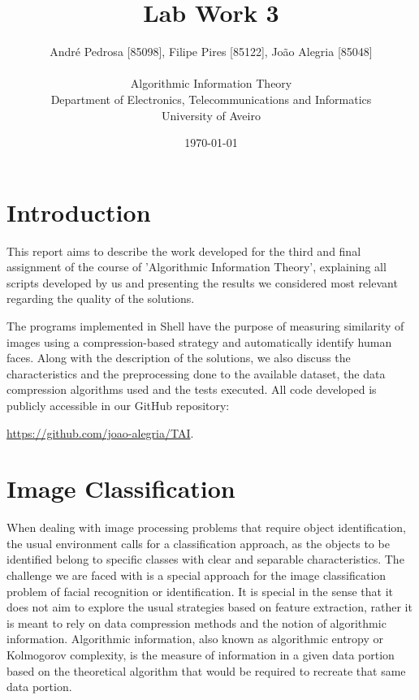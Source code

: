 \documentclass[12pt]{article}
\title{Lab Work 3}
\author
{André Pedrosa [85098], Filipe Pires [85122], João Alegria [85048]\\
\\
Algorithmic Information Theory\\
\normalsize{Department of Electronics, Telecommunications and Informatics}\\
\normalsize{University of Aveiro}\\
}
\date{\today{}}
\begin{document}
 

\baselineskip18pt

\maketitle 

\section{Introduction} %

This report aims to describe the work developed for the third and final assignment of the course of 'Algorithmic Information Theory', explaining all scripts
developed by us and presenting the results we considered most relevant regarding the quality of the solutions. 

The programs implemented in Shell have the purpose of measuring similarity of images using a compression-based strategy and automatically identify human faces.
Along with the description of the solutions, we also discuss the characteristics and the preprocessing done to the available dataset, the data compression 
algorithms used and the tests executed.
All code developed is publicly accessible in our GitHub repository: 

\url{https://github.com/joao-alegria/TAI}.
\newpage

\section{Image Classification} \label{classification} %

When dealing with image processing problems that require object identification, the usual environment calls for a classification approach, as the objects to 
be identified belong to specific classes with clear and separable characteristics.
The challenge we are faced with \cite{trab3} is a special approach for the image classification problem of facial recognition or identification.
It is special in the sense that it does not aim to explore the usual strategies based on feature extraction, rather it is meant to rely on data compression 
methods and the notion of algorithmic information.
Algorithmic information, also known as algorithmic entropy or Kolmogorov complexity, is the measure of information in a given data portion based on the 
theoretical algorithm that would be required to recreate that same data portion. 
\end{document}
